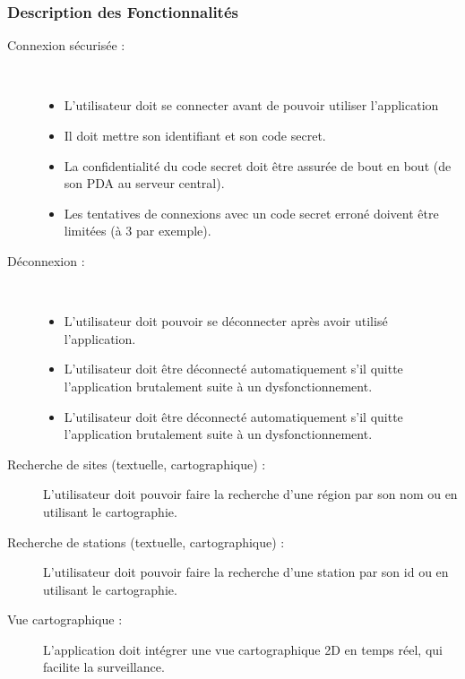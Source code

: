 \subsubsection{Description des Fonctionnalités}

\begin{description}
\item [Connexion sécurisée :] \hfill\\
	\begin{itemize}
	\item L'utilisateur doit se connecter avant de pouvoir utiliser l'application
	\item Il doit mettre son identifiant et son code secret.
	\item La confidentialité du code secret doit être assurée de bout en bout (de son PDA au serveur central).
	\item Les tentatives de connexions avec un code secret erroné doivent être limitées (à 3 par exemple).
	\end{itemize}

\item [Déconnexion :]\hfill\\
	\begin{itemize}
	\item L'utilisateur doit pouvoir se déconnecter après avoir utilisé l'application.

	\item L'utilisateur doit être déconnecté automatiquement s'il quitte l'application 
	brutalement suite à un dysfonctionnement.

	\item L'utilisateur doit être déconnecté automatiquement s'il quitte l'application brutalement suite à un dysfonctionnement.

	\end{itemize}

\item [Recherche de sites (textuelle, cartographique) :]
L'utilisateur doit pouvoir faire la recherche d'une région par son nom ou en utilisant le cartographie.

\item  [Recherche de stations (textuelle, cartographique) :] 
L'utilisateur doit pouvoir faire la recherche d'une station par son id ou en utilisant le cartographie.

\item [Vue cartographique :]
L'application doit intégrer une vue cartographique 2D en temps réel, qui facilite la surveillance.


\end{description}
